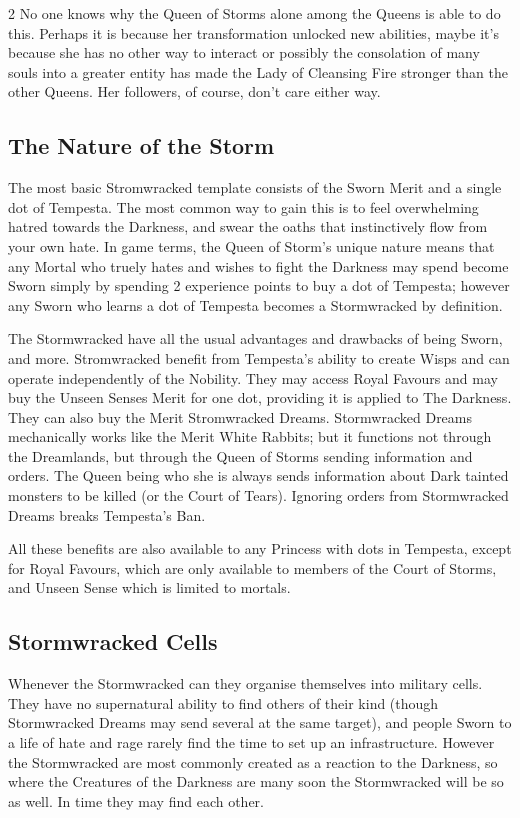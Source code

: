 \begin{multicols}{2}
No one knows why the Queen of Storms alone among the Queens is able to do this. Perhaps it is because her transformation unlocked new abilities, maybe it's because she has no other way to interact or possibly the consolation of many souls into a greater entity has made the Lady of Cleansing Fire stronger than the other Queens. Her followers, of course, don't care either way.

\subsection*{The Nature of the Storm}

The most basic Stromwracked template consists of the Sworn Merit and a single dot of Tempesta. The most common way to gain this is to feel overwhelming hatred towards the Darkness, and swear the oaths that instinctively flow from your own hate. In game terms, the Queen of Storm's unique nature means that any Mortal who truely hates and wishes to fight the Darkness may spend become Sworn simply by spending 2 experience points to buy a dot of Tempesta; however any Sworn who learns a dot of Tempesta becomes a Stormwracked by definition.

The Stormwracked have all the usual advantages and drawbacks of being Sworn, and more. Stromwracked benefit from Tempesta's ability to create Wisps and can operate independently of the Nobility. They may access Royal Favours and may buy the Unseen Senses Merit for one dot, providing it is applied to The Darkness. They can also buy the Merit Stromwracked Dreams. Stormwracked Dreams mechanically works like the Merit White Rabbits; but it functions not through the Dreamlands, but through the Queen of Storms sending information and orders. The Queen being who she is always sends information about Dark tainted monsters to be killed (or the Court of Tears). Ignoring orders from Stormwracked Dreams breaks Tempesta's Ban. 

All these benefits are also available to any Princess with dots in Tempesta, except for Royal Favours, which are only available to members of the Court of Storms, and Unseen Sense which is limited to mortals.

\subsection*{Stormwracked Cells}

Whenever the Stormwracked can they organise themselves into military cells. They have no supernatural ability to find others of their kind (though Stormwracked Dreams may send several at the same target), and people Sworn to a life of hate and rage rarely find the time to set up an infrastructure. However the Stormwracked are most commonly created as a reaction to the Darkness, so where the Creatures of the Darkness are many soon the Stormwracked will be so as well. In time they may find each other. 


\end{multicols}
